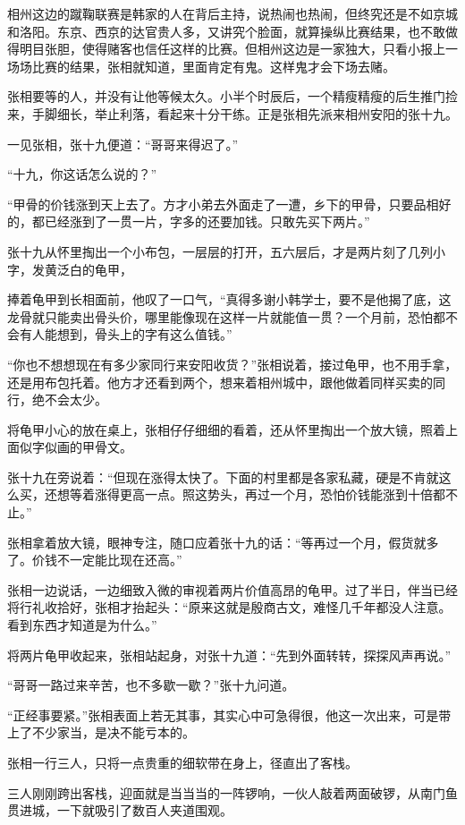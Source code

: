 相州这边的蹴鞠联赛是韩家的人在背后主持，说热闹也热闹，但终究还是不如京城和洛阳。东京、西京的达官贵人多，又讲究个脸面，就算操纵比赛结果，也不敢做得明目张胆，使得赌客也信任这样的比赛。但相州这边是一家独大，只看小报上一场场比赛的结果，张相就知道，里面肯定有鬼。这样鬼才会下场去赌。

张相要等的人，并没有让他等候太久。小半个时辰后，一个精瘦精瘦的后生推门捡来，手脚细长，举止利落，看起来十分干练。正是张相先派来相州安阳的张十九。

一见张相，张十九便道：“哥哥来得迟了。”

“十九，你这话怎么说的？”

“甲骨的价钱涨到天上去了。方才小弟去外面走了一遭，乡下的甲骨，只要品相好的，都已经涨到了一贯一片，字多的还要加钱。只敢先买下两片。”

张十九从怀里掏出一个小布包，一层层的打开，五六层后，才是两片刻了几列小字，发黄泛白的龟甲，

捧着龟甲到长相面前，他叹了一口气，“真得多谢小韩学士，要不是他揭了底，这龙骨就只能卖出骨头价，哪里能像现在这样一片就能值一贯？一个月前，恐怕都不会有人能想到，骨头上的字有这么值钱。”

“你也不想想现在有多少家同行来安阳收货？”张相说着，接过龟甲，也不用手拿，还是用布包托着。他方才还看到两个，想来着相州城中，跟他做着同样买卖的同行，绝不会太少。

将龟甲小心的放在桌上，张相仔仔细细的看着，还从怀里掏出一个放大镜，照着上面似字似画的甲骨文。

张十九在旁说着：“但现在涨得太快了。下面的村里都是各家私藏，硬是不肯就这么买，还想等着涨得更高一点。照这势头，再过一个月，恐怕价钱能涨到十倍都不止。”

张相拿着放大镜，眼神专注，随口应着张十九的话：“等再过一个月，假货就多了。价钱不一定能比现在还高。”

张相一边说话，一边细致入微的审视着两片价值高昂的龟甲。过了半日，伴当已经将行礼收拾好，张相才抬起头：“原来这就是殷商古文，难怪几千年都没人注意。看到东西才知道是为什么。”

将两片龟甲收起来，张相站起身，对张十九道：“先到外面转转，探探风声再说。”

“哥哥一路过来辛苦，也不多歇一歇？”张十九问道。

“正经事要紧。”张相表面上若无其事，其实心中可急得很，他这一次出来，可是带上了不少家当，是决不能亏本的。

张相一行三人，只将一点贵重的细软带在身上，径直出了客栈。

三人刚刚跨出客栈，迎面就是当当当的一阵锣响，一伙人敲着两面破锣，从南门鱼贯进城，一下就吸引了数百人夹道围观。

